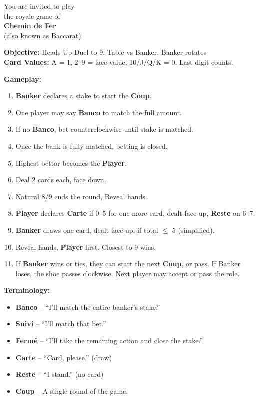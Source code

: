 \documentclass[11pt]{article}
\begin{document}
\begin{multicols}{2}

\begin{center}
    {\headingfont\fontsize{20}{24}\selectfont You are invited to play}\\[2pt]
    {\headingfont\fontsize{12}{14}\selectfont the royale game of}\\[2pt]
    {\headingfont\fontsize{22}{26}\selectfont \textbf{Chemin de Fer}}\\[4pt]
    {\headingfont\fontsize{8}{10}\selectfont (also known as Baccarat)}
\end{center}

\vspace{0.5in}

\textbf{Objective:} Heads Up Duel to 9, Table vs Banker, Banker rotates\\
\textbf{Card Values:} A = 1, 2–9 = face value, 10/J/Q/K = 0. Last digit counts.

\vspace{0.5em}
\textbf{Gameplay:}
\begin{enumerate}
\item \textbf{Banker} declares a stake to start the \textbf{Coup}.
\item One player may say \textbf{Banco} to match the full amount.
\item If no \textbf{Banco}, bet counterclockwise until stake is matched.
\item Once the bank is fully matched, betting is closed.
\item Highest bettor becomes the \textbf{Player}.
\item Deal 2 cards each, face down.
\item Natural 8/9 ends the round, Reveal hands.
\item \textbf{Player} declares \textbf{Carte} if 0–5 for one more card, dealt face-up, \textbf{Reste} on 6–7.
\item \textbf{Banker} draws one card, dealt face-up, if total $\leq$ 5 (simplified).
\item Reveal hands, \textbf{Player} first. Closest to 9 wins.
\item If \textbf{Banker} wins or ties, they can start the next
\textbf{Coup}, or pass. If Banker loses, the shoe passes clockwise.
Next player may accept or pass the role.
\end{enumerate}

\vspace{0.5em}
\textbf{Terminology:}
\begin{itemize}
\item \textbf{Banco} – “I’ll match the entire banker's stake.”
\item \textbf{Suivi} – “I’ll match that bet.”
\item \textbf{Fermé} – “I'll take the remaining action and close the stake.”
\item \textbf{Carte} – “Card, please.” (draw)
\item \textbf{Reste} – “I stand.” (no card)
\item \textbf{Coup} – A single round of the game.
\end{itemize}
\end{multicols}
\end{document}

